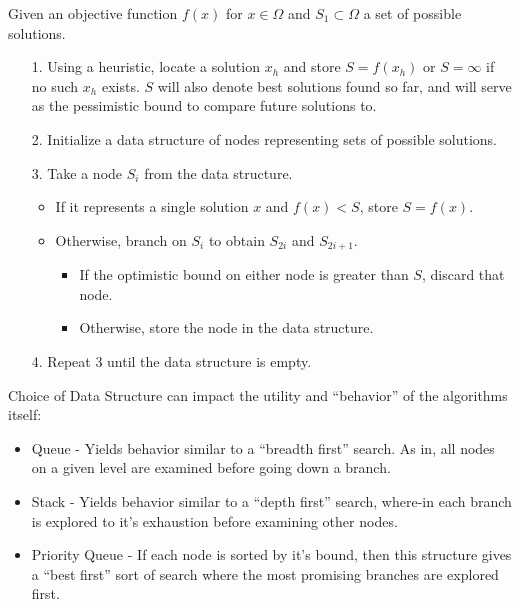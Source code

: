 \documentclass{article}
\begin{document}
\noindent
Given an objective function $f(x)$ for $x \in \Omega$ and $S_1 \subset \Omega$ a set
of possible solutions. \\
\begin{itemize}
    \item[1.] Using a heuristic, locate a solution $x_h$ and store $S = f(x_h)$ or 
    $S= \infty$ if no such $x_h$ exists. $S$ will also denote best solutions found
    so far, and will serve as the pessimistic bound to compare future solutions to.
    \item[2.] Initialize a data structure of nodes representing sets of possible solutions.
    \item[3.] Take a node $S_i$ from the data structure.
    \begin{itemize}
        \item If it represents a single solution $x$
        and $f(x) < S$, store $S = f(x)$.
        \item Otherwise, branch on $S_i$ to obtain $S_{2i}$ and $S_{2i+1}$.
        \begin{itemize}
            \item If the optimistic bound on either node is greater than $S$, discard that node.
            \item Otherwise, store the node in the data structure.
        \end{itemize}
    \end{itemize}
    \item[4.] Repeat 3 until the data structure is empty.
\end{itemize}

\noindent
Choice of Data Structure can impact the utility and ``behavior'' of the algorithms 
itself:
\begin{itemize}
    \item Queue - Yields behavior similar to a ``breadth first'' search. As in, all 
    nodes on a given level are examined before going down a branch.
    \item Stack - Yields behavior similar to a ``depth first'' search, where-in each 
    branch is explored to it's exhaustion before examining other nodes.
    \item Priority Queue - If each node is sorted by it's bound, then this structure 
    gives a ``best first'' sort of search where the most promising branches are 
    explored first.
\end{itemize}
\end{document}
